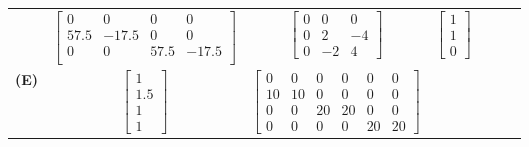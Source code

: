 \begin{sidewaystable}
{\begin{tabular}{c c c c c c c}
			& $\displaystyle \begin{bmatrix}

				0 & 0 & 0 & 0 \\

				57.5 & -17.5 & 0 & 0 \\

				0 & 0 & 57.5 & -17.5 \\

			\end{bmatrix}$

			& $\displaystyle \begin{bmatrix}

				0 & 0 & 0 \\

				0 & 2 & -4 \\

				0 & -2 & 4 \end{bmatrix}$

			& $\displaystyle \begin{bmatrix} 1 \\ 1 \\ 0 \end{bmatrix}$\\[1em]
			\textbf{(E)} 

			& $\displaystyle \begin{bmatrix}

				1 \\

				1.5\\

				1\\
				1
			\end{bmatrix}$



			& $\displaystyle \begin{bmatrix}

				0 & 0 & 0 & 0 & 0 & 0 \\
				10 & 10 & 0 & 0 & 0 & 0 \\
				0 & 0 & 20 & 20 & 0 & 0 \\
				0 & 0 & 0 & 0 & 20 & 20
			\end{bmatrix}$


\end{tabular}}
\end{sidewaystable}
